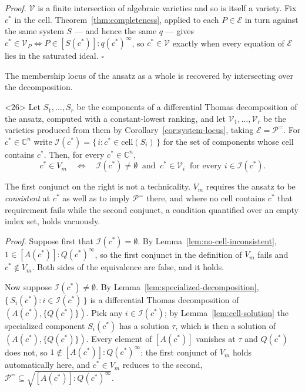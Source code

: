 \documentclass{article}
\theoremstyle{definition}
\theoremstyle{plain}
\newcommand{\qedbox}{\hspace*{\fill}\ensuremath{\square}}
\begin{document}
{\it Proof.}
$\mathcal{V}$ is a finite intersection of algebraic varieties and so is itself a
variety.  Fix $c^*$ in the cell.  Theorem~\ref{thm:completeness}, applied to
each $P \in \mathcal{E}$ in turn against the same system $S$ --- and hence the
same $q$ --- gives $c^* \in \mathcal{V}_P \iff P \in [S(c^*)] : q(c^*)^\infty$,
so $c^* \in \mathcal{V}$ exactly when every equation of $\mathcal{E}$ lies in
the saturated ideal.
\qedbox

\medskip
The membership
locus of the ansatz as a whole is recovered by intersecting over the
decomposition.

\vfill\eject

\begin{corollary}<26>
\label{cor:assembly}
Let $S_1, \ldots, S_r$ be the components of a differential Thomas decomposition
of the ansatz, computed with a constant-lowest ranking, and let
$\mathcal{V}_1, \ldots, \mathcal{V}_r$ be the varieties produced from them by
Corollary~\ref{cor:system-locus}, taking $\mathcal{E} = \mathcal{P}^=$.  For
$c^* \in \mathbb{C}^n$ write
$\mathcal{I}(c^*) = \{\, i : c^* \in \mathrm{cell}(S_i) \,\}$ for the set of
components whose cell contains $c^*$.  Then, for every $c^* \in \mathbb{C}^n$,
%
\[
c^* \in V_m
\quad\Longleftrightarrow\quad
\mathcal{I}(c^*) \neq \emptyset
\ \text{ and }\
c^* \in \mathcal{V}_i \ \text{ for every } i \in \mathcal{I}(c^*) .
\]
\end{corollary}

\medskip
\noindent
The first conjunct on the right is not a technicality.  $V_m$ requires the
ansatz to be {\it consistent} at $c^*$ as well as to imply $\mathcal{P}^=$
there, and where no cell contains $c^*$ that requirement fails while the
second conjunct, a condition quantified over an empty index set, holds
vacuously.

{\it Proof.}
Suppose first that $\mathcal{I}(c^*) = \emptyset$.  By
Lemma~\ref{lem:no-cell-inconsistent}, $1 \in [A(c^*)] : Q(c^*)^\infty$, so the
first conjunct in the definition of $V_m$ fails and $c^* \notin V_m$.  Both
sides of the equivalence are false, and it holds.

Now suppose $\mathcal{I}(c^*) \neq \emptyset$.  By
Lemma~\ref{lem:specialized-decomposition},
$\{\, S_i(c^*) : i \in \mathcal{I}(c^*) \,\}$ is a differential Thomas
decomposition of $(A(c^*), \{Q(c^*)\})$.  Pick any
$i \in \mathcal{I}(c^*)$; by Lemma~\ref{lem:cell-solution} the specialized
component $S_i(c^*)$ has a solution $\tau$, which is then a solution of
$(A(c^*), \{Q(c^*)\})$.  Every element of $[A(c^*)]$ vanishes at $\tau$ and
$Q(c^*)$ does not, so $1 \notin [A(c^*)] : Q(c^*)^\infty$: the first conjunct
of $V_m$ holds automatically here, and $c^* \in V_m$ reduces to the second,
$\mathcal{P}^= \subseteq \sqrt{[A(c^*)] : Q(c^*)^\infty}$.
\end{document}
